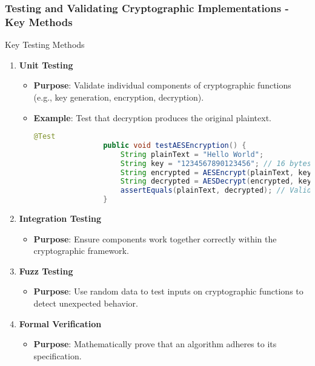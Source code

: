 \documentclass{beamer}
\begin{document}
\begin{frame}[fragile]
    \frametitle{Testing and Validating Cryptographic Implementations - Key Methods}
    \begin{block}{Key Testing Methods}
        \begin{enumerate}
            \item \textbf{Unit Testing}
            \begin{itemize}
                \item \textbf{Purpose}: Validate individual components of cryptographic functions (e.g., key generation, encryption, decryption).
                \item \textbf{Example}: Test that decryption produces the original plaintext.
                \begin{lstlisting}[language=java]
                @Test
                public void testAESEncryption() {
                    String plainText = "Hello World";
                    String key = "1234567890123456"; // 16 bytes key for AES
                    String encrypted = AESEncrypt(plainText, key);
                    String decrypted = AESDecrypt(encrypted, key);
                    assertEquals(plainText, decrypted); // Validate that original text is retrieved
                }
                \end{lstlisting}
            \end{itemize}
            \item \textbf{Integration Testing}
            \begin{itemize}
                \item \textbf{Purpose}: Ensure components work together correctly within the cryptographic framework.
            \end{itemize}
            \item \textbf{Fuzz Testing}
            \begin{itemize}
                \item \textbf{Purpose}: Use random data to test inputs on cryptographic functions to detect unexpected behavior.
            \end{itemize}
            \item \textbf{Formal Verification}
            \begin{itemize}
                \item \textbf{Purpose}: Mathematically prove that an algorithm adheres to its specification.
            \end{itemize}
        \end{enumerate}
    \end{block}
\end{frame}
\end{document}
